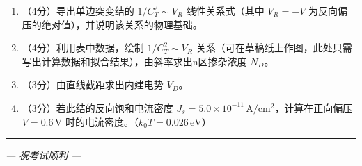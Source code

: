 \documentclass[12pt,a4paper]{ctexart}
\newcommand{\选择题}{\stepcounter{qcounter}\arabic{qcounter}.\,}
\newcommand{\填空题}{\stepcounter{qcounter}\arabic{qcounter}.\,}
\begin{document}
\begin{enumerate}[label=(\arabic*),nosep,leftmargin=0em]
\item （4分）导出单边突变结的 $1/C_T^2 \sim V_R$ 线性关系式（其中 $V_R = -V$ 为反向偏压的绝对值），并说明该关系的物理基础。
\item （4分）利用表中数据，绘制 $1/C_T^2 \sim V_R$ 关系（可在草稿纸上作图，此处只需写出计算数据和拟合结果），由斜率求出n区掺杂浓度 $N_D$。
\item （3分）由直线截距求出内建电势 $V_D$。
\item （3分）若此结的反向饱和电流密度 $J_s = 5.0 \times 10^{-11}\,\text{A}/\text{cm}^2$，计算在正向偏压 $V = 0.6\,\text{V}$ 时的电流密度。（$k_0T = 0.026\,\text{eV}$）
\end{enumerate}

\vspace{18cm}

\hrule
\vspace{8pt}

\begin{center}
\textit{--- 祝考试顺利 ---}
\end{center}
\end{document}
